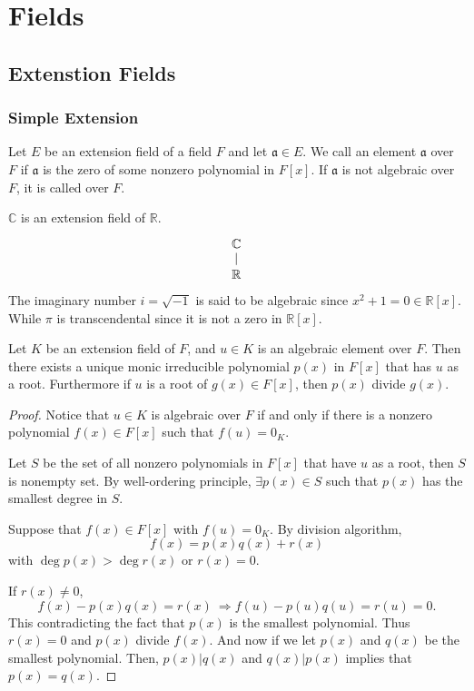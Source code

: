 \chapter{Fields}

\section{Extenstion Fields}

\subsection{Simple Extension}

\begin{definition}
    Let $E$ be an extension field of a field $F$ and let $\mathfrak{a} \in E$. We call an element 
    $\mathfrak{a}$  over $F$ if $\mathfrak{a}$ is the zero of some nonzero 
    polynomial in $F[x]$. If $\mathfrak{a}$ is not algebraic over $F$, it is called 
     over $F$.
\end{definition}

\begin{example}
    $\mathbb{C}$ is an extension field of $\mathbb{R}$.
    \[
        \begin{tikzcd}[row sep=1.0em]
            \mathbb{C} \arrow[dash]{d}\\
            \mathbb{R}
        \end{tikzcd}
    \]
    The imaginary number $i = \sqrt{-1}$ is said to be algebraic since $x^2 + 1 = 0 \in \mathbb{R}[x]$. While 
    $\pi$ is transcendental since it is not a zero in $\mathbb{R}[x]$.
\end{example}

\begin{theorem}
    Let $K$ be an extension field of $F$, and $u \in K$ is an algebraic element over $F$. Then there exists 
    a unique monic irreducible polynomial $p(x)$ in $F[x]$ that has $u$ as a root. 
    Furthermore if $u$ is a root of $g(x) \in F[x]$, then $p(x)$ divide $g(x)$.
\end{theorem}
\begin{proof}
    Notice that $u \in K$ is algebraic over $F$ if and only if there is a nonzero polynomial 
    $f(x) \in F[x]$ such that $f(u) = 0_K$.

    Let $S$ be the set of all nonzero polynomials in $F[x]$ that have $u$ as a root, then $S$ is nonempty set.
    By well-ordering principle, $\exists p(x) \in S$ such that $p(x)$ has the smallest degree in $S$.

    Suppose that $f(x) \in F[x]$ with $f(u) = 0_K$. By division algorithm, 
    \[
        f(x) = p(x) q(x) + r(x)
    \]
    with $\deg p(x) > \deg r(x)$ or $r(x) = 0$.

    If $r(x) \neq 0$, 
    \[
        f(x) - p(x) q(x) = r(x) \> \Longrightarrow f(u) - p(u) q(u) = r(u) = 0.
    \]
    This contradicting the fact that $p(x)$ is the smallest polynomial. Thus $r(x) = 0$ and 
    $p(x)$ divide $f(x)$. And now if we let $p(x)$ and $q(x)$ be the smallest polynomial. Then, 
    $p(x) | q(x)$ and $q(x) | p(x)$ implies that $p(x) = q(x)$.
\end{proof}

